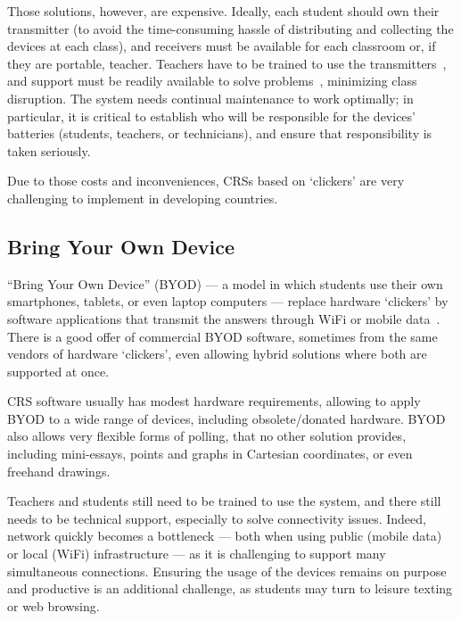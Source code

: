 Those solutions, however, are expensive. Ideally, each student should own their transmitter (to avoid the time-consuming hassle of distributing and collecting the devices at each class), and receivers must be available for each classroom or, if they are portable, teacher. Teachers have to be trained to use the transmitters~\cite{beatty2005transforming}, and support must be readily available to solve problems~\cite{caldwell2007clickers}, minimizing class disruption. The system needs continual maintenance to work optimally; in particular, it is critical to establish who will be responsible for the devices' batteries (students, teachers, or technicians), and ensure that  responsibility is taken seriously.

Due to those costs and inconveniences, CRSs based on ‘clickers’ are very challenging to implement in developing countries.

\subsection{Bring Your Own Device}

“Bring Your Own Device” (BYOD) --- a model in which students use their own smartphones, tablets, or even laptop computers --- replace hardware ‘clickers’ by software applications that transmit the answers through WiFi or mobile data~\cite{stavert2013byod}. There is a good offer of commercial BYOD software, sometimes from the same vendors of hardware ‘clickers’, even allowing hybrid solutions where both are supported at once.


CRS software usually has modest hardware requirements, allowing to apply BYOD to a wide range of devices, including obsolete/donated hardware. BYOD also allows very flexible forms of polling, that no other solution provides, including mini-essays, points and graphs in Cartesian coordinates, or even freehand drawings.

Teachers and students still need to be trained to use the system, and there still needs to be technical support, especially to solve connectivity issues. Indeed, network quickly becomes a bottleneck --- both when using public (mobile data) or local (WiFi) infrastructure --- as it is challenging to support many simultaneous connections. Ensuring the usage of the devices remains on purpose and productive is an additional challenge, as students may turn to leisure texting or web browsing.

